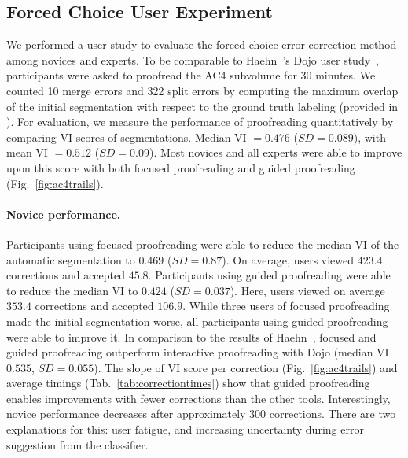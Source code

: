 \subsection{Forced Choice User Experiment}
We performed a user study to evaluate the forced choice error correction method among novices and experts. To be comparable to Haehn~\etal's Dojo user study~\cite{haehn_dojo_2014}, participants were asked to proofread the AC4 subvolume for 30 minutes. We counted 10 merge errors and 322 split errors by computing the maximum overlap of the initial segmentation with respect to the ground truth labeling (provided in \cite{haehn_dojo_2014}). For evaluation, we measure the performance of proofreading quantitatively by comparing VI scores of segmentations. Median VI $=0.476$ ($SD=0.089$), with mean VI $=0.512$ ($SD=0.09$). Most novices and all experts were able to improve upon this score with both focused proofreading and guided proofreading (Fig.~\ref{fig:ac4trails}).

\paragraph{Novice performance.} Participants using focused proofreading were able to reduce the median VI of the automatic segmentation to $0.469$ ($SD=0.87$). On average, users viewed $423.4$ corrections and accepted $45.8$.
Participants using guided proofreading were able to reduce the median VI to $0.424$ ($SD=0.037$). Here, users viewed on average $353.4$ corrections and accepted $106.9$.
While three users of focused proofreading made the initial segmentation worse, all participants using guided proofreading were able to improve it. In comparison to the results of Haehn~\etal, focused and guided proofreading outperform interactive proofreading with Dojo (median VI $0.535$, $SD=0.055$). The slope of VI score per correction (Fig.~\ref{fig:ac4trails}) and average timings (Tab.~\ref{tab:correctiontimes}) show that guided proofreading enables improvements with fewer corrections than the other tools. Interestingly, novice performance decreases after approximately $300$ corrections. There are two explanations for this: user fatigue, and increasing uncertainty during error suggestion from the classifier. %

